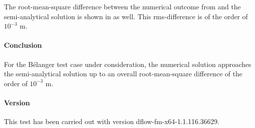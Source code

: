 The root-mean-square difference between the numerical outcome from \DFLOWFM and the semi-analytical solution is shown in  as well. This rms-difference is of the order of $10^{-3}$ m. 


\paragraph*{Conclusion}
For the B\'elanger test case under consideration, the numerical solution approaches the semi-analytical solution up to an overall root-mean-square difference of the order of $10^{-3}$ m.




\paragraph*{Version}
This test has been carried out with version dflow-fm-x64-1.1.116.36629.


